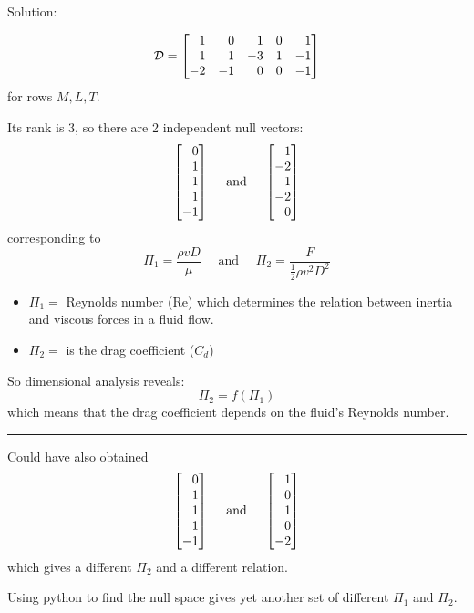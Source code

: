 \begin{solution}
\begin{slide}

Solution:

\[ \mathcal{D} = 
	\mat{1 & 0 & 1  & 0 & 1 \\
		1 & 1 & -3 & 1 & -1 \\
		-2 & -1 & 0 & 0 & -1}
\]
for rows $M,L,T$.

Its rank is 3, so there are 2 independent null vectors:
\[ \mat{0\\1\\1\\1\\-1} \quad \text{ and } \quad \mat{1\\-2\\-1\\-2\\0}
\]
corresponding to
\[
\Pi_1 = \frac{\rho v D}{\mu}
\quad \text{ and } \quad 
\Pi_2 = \frac{F}{\frac12\rho v^2 D^2}
\]

\begin{itemize}
	\item $\Pi_1 = $ Reynolds number (Re) which determines the relation between inertia and viscous forces in a fluid flow.
	\item $\Pi_2 = $ is the drag coefficient ($C_d$)
\end{itemize}

So dimensional analysis reveals:
\[ \Pi_2 = f(\Pi_1) \]
which means that the drag coefficient depends on the fluid's Reynolds number. \\

\hrule

Could have also obtained
\[ \mat{0\\1\\1\\1\\-1} \quad \text{ and } \quad \mat{1\\0\\1\\0\\-2} \]
which gives a different $\Pi_2$ and a different relation.
\end{slide}


\begin{slide}

	Using python to find the null space gives yet another set of different $\Pi_1$ and $\Pi_2$.


\end{slide}
\end{solution}
